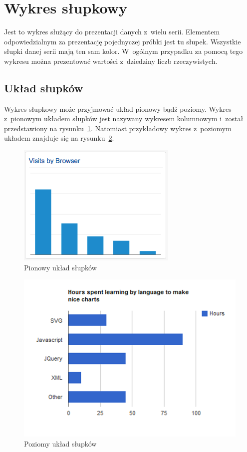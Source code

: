 \section{Wykres słupkowy}
Jest to wykres służący do prezentacji danych z~wielu serii. Elementem odpowiedzialnym za prezentację pojednyczej próbki jest tu słupek. Wszystkie słupki danej serii mają ten sam kolor. W~ogólnym przypadku za pomocą tego wykresu można prezentować wartości z~dziedziny liczb rzeczywistych.

\subsection{Układ słupków} 
Wykres słupkowy może przyjmować układ pionowy bądź poziomy. Wykres z~pionowym układem słupków jest  nazywany wykresem kolumnowym i~został przedstawiony na rysunku~\ref{rys:wykres:pion}. Natomiast przykładowy wykres z~poziomym układem znajduje się na rysunku~\ref{rys:wykres:poziom}.

\begin{figure}[H]
\centering
\includegraphics[scale=0.8]{img/bar-ver.png}
\caption{Pionowy układ słupków}\label{rys:wykres:pion}
\end{figure}

\begin{figure}[H]
\centering
\includegraphics[scale=0.8]{img/bar-hor.png}
\caption{Poziomy układ słupków}\label{rys:wykres:poziom}
\end{figure}


